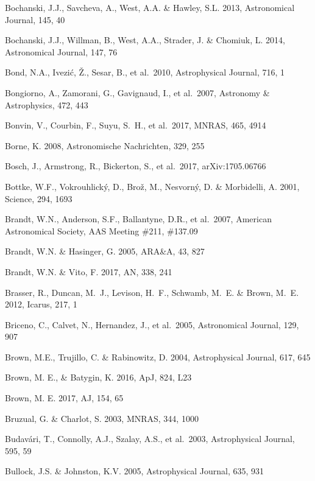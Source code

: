 \documentclass[twocolumn]{aastex61}
\begin{document}
\begin{thebibliography}{}
\bibitem[()]{} Bochanski, J.J., Savcheva, A., West, A.A. \& Hawley, S.L. 2013, Astronomical Journal, 145, 40

\bibitem[()]{} Bochanski, J.J., Willman, B., West, A.A., Strader, J. \& Chomiuk, L. 2014, Astronomical Journal, 147, 76

\bibitem[()]{} Bond, N.A.,  Ivezi\'{c}, \v{Z}., Sesar, B., et al.~2010, Astrophysical Journal, 716, 1

\bibitem[()]{} Bongiorno, A., Zamorani, G., Gavignaud, I., et al.~2007, Astronomy \& Astrophysics, 472, 443

\bibitem[()]{} Bonvin, V., Courbin, F., Suyu, S.~H., et al.\ 2017, MNRAS, 465, 4914

\bibitem[()]{} Borne, K. 2008, Astronomische Nachrichten, 329, 255


\bibitem[()]{} Bosch, J., Armstrong, R., Bickerton, S., et al.~2017,  arXiv:1705.06766

\bibitem[()]{} Bottke, W.F., Vokrouhlick\'{y}, D., Bro\v{z}, M., Nesvorn\'y, D. \& Morbidelli, A. 2001,
             Science, 294, 1693

\bibitem[()]{} Brandt, W.N., Anderson, S.F., Ballantyne, D.R., et al.~2007, American Astronomical
             Society, AAS Meeting \#211, \#137.09

\bibitem[()]{} Brandt, W.N. \& Hasinger, G. 2005, ARA\&A, 43, 827

\bibitem[()]{} Brandt, W.N. \& Vito, F. 2017, AN, 338, 241

\bibitem[()]{} Brasser, R., Duncan, M.~J., Levison, H.~F., Schwamb, M.~E. \& Brown, M.~E. 2012, Icarus, 217, 1

\bibitem[()]{} Briceno, C., Calvet, N., Hernandez, J., et al.~2005, Astronomical Journal, 129, 907

\bibitem[()]{} Brown, M.E., Trujillo, C. \& Rabinowitz, D. 2004, Astrophysical Journal, 617, 645

\bibitem[()]{} Brown, M. E., \& Batygin, K. 2016, ApJ, 824, L23

\bibitem[()]{} Brown, M. E. 2017, AJ, 154, 65

\bibitem[()]{} Bruzual, G. \& Charlot, S. 2003, MNRAS, 344, 1000

\bibitem[()]{} Budav\'{a}ri, T., Connolly, A.J., Szalay, A.S., et al.~2003, Astrophysical Journal, 595, 59

\bibitem[()]{} Bullock, J.S. \& Johnston, K.V. 2005,  Astrophysical Journal, 635, 931


\end{thebibliography}
\end{document}
